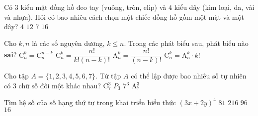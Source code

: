 \begin{ex}%
	Có $3$ kiểu mặt đồng hồ đeo tay (vuông, tròn, elip) và $4$ kiểu dây (kim loại, da, vải và nhựa). Hỏi có bao nhiêu cách chọn một chiếc đồng hồ gồm một mặt và một dây?
	\choice
	{$4$}
	{\True $12$}
	{$7$}
	{$16$}
\end{ex}

\begin{ex}%
	Cho $k,n$ là các số nguyên dương, $k \leq n$. Trong các phát biểu sau, phát biểu nào \textbf{sai}?
	\choice
	{$\mathrm{C}_n^k=\mathrm{C}_n^{n-k}$}
	{$\mathrm{C}_n^k=\dfrac{n!}{k!(n-k)!}$}
	{$\mathrm{A}_n^k=\dfrac{n!}{(n-k)!}$}
	{\True $\mathrm{C}_n^k=\mathrm{A}_n^k \cdot k!$}
\end{ex}

\begin{ex}%
	Cho tập $A=\{1,2,3,4,5,6,7\}$. Từ tập $A$ có thể lập được bao nhiêu số tự nhiên có $3$ chữ số đôi một khác nhau?
	\choice
	{$\mathrm{C}_7^3$}
	{$P_3$}
	{$7^3$}
	{\True $\mathrm{A}_7^3$}
\end{ex}

\begin{ex}%
	Tìm hệ số của số hạng thứ tư trong khai triển biểu thức $(3x + 2y)^{4}$
	\choice
	{$81$}
	{$216$}
	{\True $96$}
	{$16$}
\end{ex}

